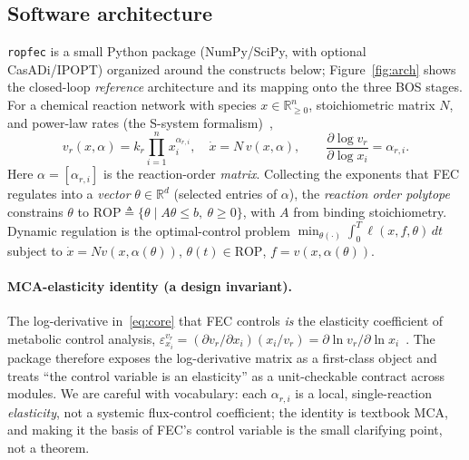 \documentclass[11pt]{article}
\newcommand{\rop}{\mathrm{ROP}}
\newcommand{\code}[1]{\texttt{#1}}
\begin{document}
\subsection{Software architecture}
\code{ropfec} is a small Python package (NumPy/SciPy, with optional CasADi/IPOPT) organized
around the constructs below; Figure~\ref{fig:arch} shows the closed-loop \emph{reference}
architecture and its mapping onto the three BOS stages. For a chemical reaction network with
species $x\in\mathbb{R}^n_{\ge0}$, stoichiometric matrix $N$, and power-law
rates (the {S}-system formalism)~\citep{savageau1969,feinberg2019crnt,alon2019systems},
\begin{equation}
v_r(x,\alpha)=k_r\prod_{i=1}^{n}x_i^{\alpha_{r,i}},\quad \dot{x}=N\,v(x,\alpha),\qquad
\frac{\partial\log v_r}{\partial\log x_i}=\alpha_{r,i}.
\label{eq:core}
\end{equation}
Here $\alpha=[\alpha_{r,i}]$ is the reaction-order \emph{matrix}. Collecting the exponents that
FEC regulates into a \emph{vector} $\theta\in\mathbb{R}^d$ (selected entries of $\alpha$), the
\emph{reaction order polytope} constrains $\theta$ to
$\rop\triangleq\{\theta\mid A\theta\le b,\ \theta\ge0\}$, with $A$ from binding stoichiometry.
Dynamic regulation is the optimal-control problem
$\min_{\theta(\cdot)}\int_0^T\ell(x,f,\theta)\,dt$ subject to
$\dot x=Nv(x,\alpha(\theta))$, $\theta(t)\in\rop$, $f=v(x,\alpha(\theta))$.

\paragraph{MCA-elasticity identity (a design invariant).} The log-derivative
in~\eqref{eq:core} that FEC controls \emph{is} the elasticity coefficient of metabolic
control analysis, $\varepsilon^{v_r}_{x_i}=(\partial v_r/\partial x_i)(x_i/v_r)=
\partial\ln v_r/\partial\ln x_i$~\citep{kacser1973control,heinrich1974linear,fell1997understanding}.
The package therefore exposes the log-derivative matrix as a first-class object and treats
``the control variable is an elasticity'' as a unit-checkable contract across modules.
We are careful with vocabulary: each $\alpha_{r,i}$ is a local, single-reaction \emph{elasticity}, not
a systemic flux-control coefficient; the identity is textbook MCA, and making it the basis
of FEC's control variable is the small clarifying point, not a theorem.
\end{document}
